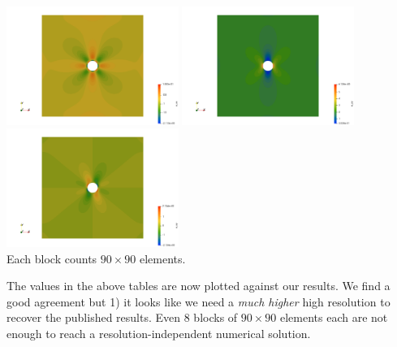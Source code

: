 \begin{center}
\includegraphics[width=5.6cm]{python_codes/fieldstone_124/results/exp3/exx}
\includegraphics[width=5.6cm]{python_codes/fieldstone_124/results/exp3/eyy}
\includegraphics[width=5.6cm]{python_codes/fieldstone_124/results/exp3/exy}\\
{\captionfont Each block counts $90\times 90$ elements.}
\end{center}

The values in the above tables are now plotted against our results. 
We find a good agreement but 1) it looks like we need a {\it much higher}
high resolution to recover the published results. 
Even 8 blocks of $90\times 90$ elements each are not enough to reach a resolution-independent 
numerical solution.

